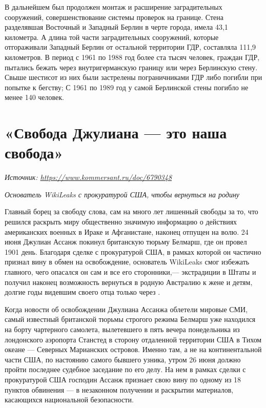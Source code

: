 В дальнейшем был продолжен монтаж и расширение заградительных сооружений, совершенствование системы проверок на границе. Стена разделявшая Восточный и Западный Берлин в черте города, имела  43,1 километра. А длина той части заградительных сооружений, которые отгораживали Западный Берлин от остальной территории ГДР, составляла 111,9 километров. В период с 1961 по 1988 год более ста тысяч человек, граждан ГДР, пытались бежать через внутригерманскую границу или через Берлинскую стену. Свыше шестисот из них были застрелены пограничниками ГДР либо погибли при попытке к бегству; С 1961 по 1989 год у самой Берлинской стены погибло не менее 140 человек.

\clearpage

\section{«Свобода Джулиана --- это наша свобода»}

\textit{Источник: \url{https://www.kommersant.ru/doc/6790348}}

\textit{Основатель WikiLeaks  с прокуратурой США, чтобы вернуться на родину}

Главный борец за свободу слова, сам на много лет лишенный свободы за то, что решился раскрыть миру общественно значимую информацию о действиях американских военных в Ираке и Афганистане, наконец отпущен на волю. 24 июня Джулиан Ассанж покинул британскую тюрьму Белмарш, где он провел 1901 день. Благодаря сделке с прокуратурой США, в рамках которой он частично признал вину в обмен на освобождение, основатель WikiLeaks смог избежать главного, чего опасался он сам и все его сторонники,--- экстрадиции в Штаты и получил наконец возможность вернуться в родную Австралию к жене и детям, долгие годы видевшим своего отца только через .

Когда новости об освобождении Джулиана Ассанжа облетели мировые СМИ, самый известный  британской тюрьмы строгого режима Белмарш уже находился на борту чартерного самолета, вылетевшего в пять вечера понедельника из лондонского аэропорта Станстед в сторону отдаленной территории США в Тихом океане --- Северных Марианских островов. Именно там, а не на континентальной части США, по настоянию самого бывшего узника, утром 26 июня должно пройти последнее судебное заседание по его делу. На нем в рамках сделки с прокуратурой США господин Ассанж признает свою вину по одному из 18 пунктов обвинения --- в незаконном получении и раскрытии материалов, касающихся национальной безопасности.

